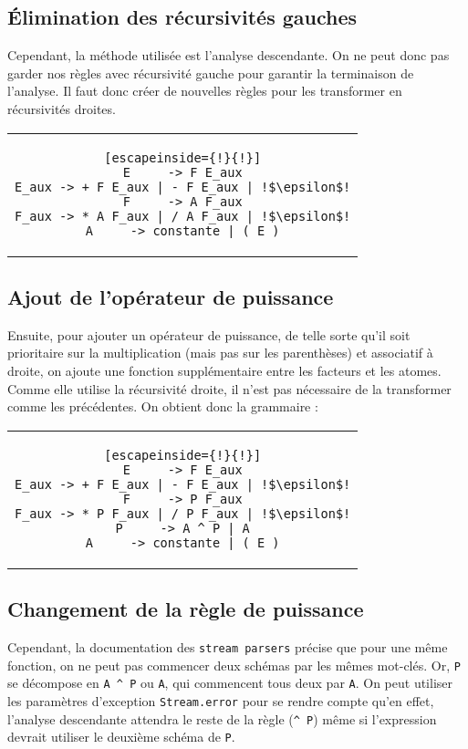 \documentclass[11pt]{article}
\begin{document}
\subsection{Élimination des récursivités gauches}
Cependant, la méthode utilisée est l'analyse descendante. On ne peut donc pas garder nos règles avec récursivité gauche pour garantir la terminaison de l'analyse. Il faut donc créer de nouvelles règles pour les transformer en récursivités droites.
\begin{center}
\begin{tabular}{c}
\begin{lstlisting}[escapeinside={!}{!}]
E     -> F E_aux
E_aux -> + F E_aux | - F E_aux | !$\epsilon$!
F     -> A F_aux
F_aux -> * A F_aux | / A F_aux | !$\epsilon$!
A     -> constante | ( E )
\end{lstlisting}
\end{tabular}
\end{center}


\subsection{Ajout de l'opérateur de puissance}
Ensuite, pour ajouter un opérateur de puissance, de telle sorte qu'il soit prioritaire sur la multiplication (mais pas sur les parenthèses) et associatif à droite, on ajoute une fonction supplémentaire entre les facteurs et les atomes. Comme elle utilise la récursivité droite, il n'est pas nécessaire de la transformer comme les précédentes. On obtient donc la grammaire : 
\begin{center}
\begin{tabular}{c}
\begin{lstlisting}[escapeinside={!}{!}]
E     -> F E_aux
E_aux -> + F E_aux | - F E_aux | !$\epsilon$!
F     -> P F_aux
F_aux -> * P F_aux | / P F_aux | !$\epsilon$!
P     -> A ^ P | A
A     -> constante | ( E )
\end{lstlisting}
\end{tabular}
\end{center}

\subsection{Changement de la règle de puissance}
Cependant, la documentation des \texttt{stream parsers} précise que pour une même fonction, on ne peut pas commencer deux schémas par les mêmes mot-clés. Or, \lstinline{P} se décompose en \lstinline{A ^ P} ou \lstinline{A}, qui commencent tous deux par \lstinline{A}. On peut utiliser les paramètres d'exception \texttt{Stream.error} pour se rendre compte qu'en effet, l'analyse descendante attendra le reste de la règle (\lstinline{^ P}) même si l'expression devrait utiliser le deuxième schéma de \lstinline{P}.
\end{document}
